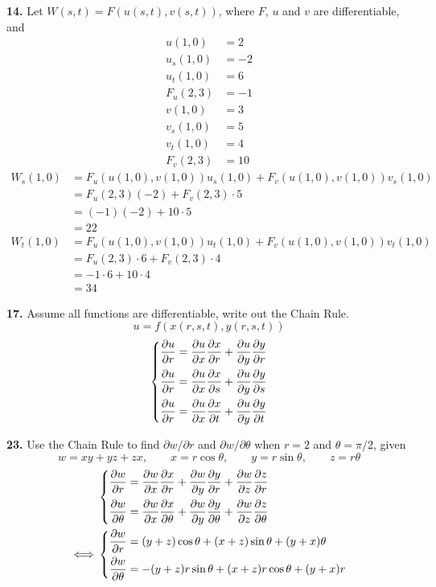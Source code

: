 \documentclass[a4paper,12pt]{article}
\newcommand{\tho}[3][]{\frac{\partial #1 #2}{\partial #3 #1}}
\newcommand{\chain}[3]{\tho{#1}{#2}\tho{#2}{#3}}
\newcommand{\exercise}[1]{\noindent\textbf{#1.}}
\begin{document}
\exercise{14} Let $W(s, t) = F(u(s, t), v(s, t))$, where $F$, $u$ and $v$ are
differentiable, and
\begin{align*}
  u(1, 0) &= 2\\
  u_s(1, 0) &= -2\\
  u_t(1, 0) &= 6\\
  F_u(2, 3) &= -1\\
  v(1, 0) &= 3\\
  v_s(1, 0) &= 5\\
  v_t(1, 0) &= 4\\
  F_v(2, 3) &= 10
\end{align*}
\begin{align*}
   W_s(1, 0)
&= F_u(u(1, 0), v(1, 0)) u_s(1, 0) + F_v(u(1, 0), v(1, 0)) v_s(1, 0)\\
&= F_u(2, 3) (-2) + F_v(2, 3) \cdot 5\\
&= (-1)(-2) + 10 \cdot 5\\
&= 22\\
   W_t(1, 0)
&= F_u(u(1, 0), v(1, 0)) u_t(1, 0) + F_v(u(1, 0), v(1, 0)) v_t(1, 0)\\
&= F_u(2, 3) \cdot 6 + F_v(2, 3) \cdot 4\\
&= -1 \cdot 6 + 10 \cdot 4\\
&= 34
\end{align*}

\exercise{17} Assume all functions are differentiable, write out the Chain Rule.
\[u = f(x(r, s, t), y(r, s, t))\]
\[\begin{dcases}
    \tho{u}{r} = \chain{u}{x}{r} + \chain{u}{y}{r}\\
    \tho{u}{r} = \chain{u}{x}{s} + \chain{u}{y}{s}\\
    \tho{u}{r} = \chain{u}{x}{t} + \chain{u}{y}{t}
  \end{dcases}\]

\exercise{23} Use the Chain Rule to find $\partial w/\partial r$ and
$\partial w/\partial\theta$ when $r = 2$ and $\theta = \pi/2$, given
\[w = xy + yz + zx,\qquad x = r\cos\theta,\qquad
  y = r\sin\theta,\qquad z = r\theta\]
\begin{align*}
& \begin{dcases}
    \tho{w}{r} = \chain{w}{x}{r} + \chain{w}{y}{r} + \chain{w}{z}{r}\\
    \tho{w}{\theta} = \chain{w}{x}{\theta} + \chain{w}{y}{\theta}
                    + \chain{w}{z}{\theta}
  \end{dcases}\\
\iff
& \begin{dcases}
    \tho{w}{r} = (y + z)\cos\theta + (x + z)\sin\theta + (y + x)\theta\\
    \tho{w}{\theta} = -(y + z)r\sin\theta + (x + z)r\cos\theta
                    + (y + x)r
  \end{dcases}
\end{align*}
\end{document}
